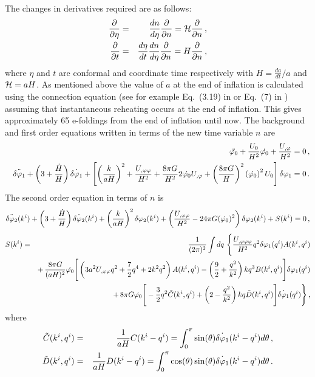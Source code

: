 The changes in derivatives required are as follows:
%
\begin{eqnarray}
 \frac{\partial  }{\partial \eta} &=& \frac{d n}{d \eta}\frac{\partial }{\partial n} = \mathcal{H} \frac{\partial }{\partial n} \,,\\
 \frac{\partial  }{\partial t} &=& \frac{d \eta}{d t} \frac{d n}{d \eta}\frac{\partial }{\partial n} = H \frac{\partial }{\partial n}\,,
\end{eqnarray}
%
where $\eta$ and $t$ are conformal and coordinate time respectively with $H =
\frac{da}{dt}/a$ and $\mathcal{H} = aH$.
As mentioned above the value
of $a$ at the end of inflation is calculated using the connection equation (see for example
Eq.~(3.19) in  or Eq.~(7) in ) assuming that instantaneous
reheating occurs
at the end of
inflation. This gives approximately 65 e-foldings from the end of inflation until now. 
% 
The background and first order equations written in terms of the new time
variable $n$ are
%
\begin{eqnarray}
&&\ddot{\varphi_{0}} + \frac{U_{0}}{H^2}\dot{\varphi_{0}} + \frac{U_{,\varphi}}{H^2} = 0 \,,
\label{eq:bgntime}\\
&&\ddot{\delta\varphi_{1}} + \left(3 + \frac{\dot{H}}{H}\right)\dot{\delta\varphi_{1}} +
\left[\left(\frac{k}{aH}\right)^2 + \frac{U_{,\varphi\varphi}}{H^2} + \frac{8\pi G}{H^2}
2\dot{\varphi_{0}}U_{,\varphi} + \left(\frac{8\pi G}{H}\right)^2
\left(\dot{\varphi_{0}}\right)^2U_{0} \right]\delta\varphi_{1} = 0\,. \label{eq:fontime}
\end{eqnarray}
% 
The second order equation in terms of $n$ is
% 
\begin{equation}
 \label{eq:KG2-fourier-sr-ntime}
\ddot{\delta\varphi_{2}}(k^i)+\left(3 + \frac{\dot{H}}{H}\right)
\dot{\delta\varphi_{2}}(k^i)+ \left(\frac{k}{aH}\right)^2\delta\varphi_{2}(k^i)
+\left(\frac{U_{,\varphi\varphi}}{H^2}-{24 \pi G}(\dot{\varphi_{0}})^2\right)
\delta\varphi_{2}(k^i) +S(k^i) = 0 \,,
\end{equation}
% 
\begin{eqnarray}
\label{eq:KG2-source-ntime}
S(\kvi) &=& \frac{1}{(2\pi)^2}\int dq\ \Bigg\{
\frac{\Uppp}{H^2} q^2 \dvp1(\qvi) A(\kvi,\qvi) \nonumber\\
&&+\, \frac{8\pi G}{(aH)^2}\dot{\vp_{0}} \Bigg[ 
\left( 3a^2\Upp q^2 + \frac{7}{2}q^4 + 2k^2q^2\right) A(\kvi,\qvi) %
-\left(\frac{9}{2} + \frac{q^2}{k^2}\right)kq^3 B(\kvi,\qvi)
\Bigg]\dvp1(\qvi) \nonumber\\
%
&&+\, 8\pi G \dot{\vp_{0}} \Bigg[
-\frac{3}{2}q^2 \tilde{C}(\kvi,\qvi) + \left(2-\frac{q^2}{k^2}\right)kq
\tilde{D}(\kvi,\qvi) 
\Bigg]\dot{\dvp1}(\qvi) \Bigg\}\,,
%
\end{eqnarray}
%
where 
%
\begin{eqnarray}
 \tilde{C}(k^i,q^i) &=& \frac{1}{aH} C(k^i-q^i) = \int_0^\pi \sin(\theta)
\dot{\delta\varphi_{1}}(k^i-q^i) d\theta \,,\nonumber \\
 \tilde{D}(k^i,q^i) &=& \frac{1}{aH} D(k^i-q^i) = \int_0^\pi \cos(\theta)
\sin(\theta) \dot{\delta\varphi_{1}}(k^i-q^i)
d\theta \,.
\end{eqnarray}



